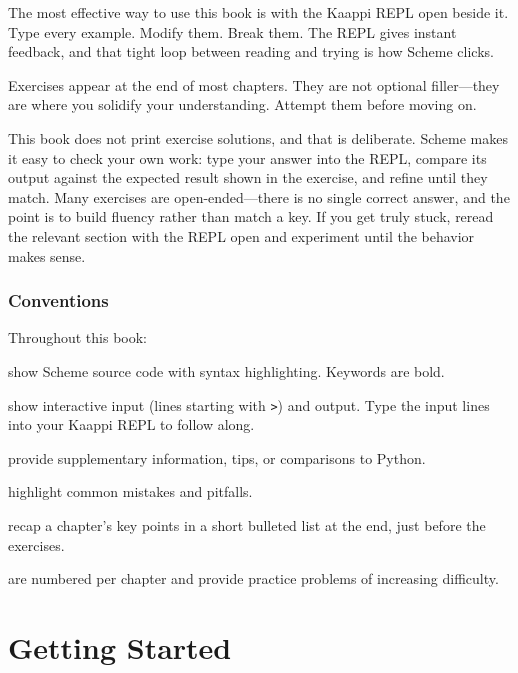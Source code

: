 \documentclass[11pt,twoside,openright]{memoir}
\begin{document}
The most effective way to use this book is with the Kaappi REPL open beside it. Type every example. Modify them. Break them. The REPL gives instant feedback, and that tight loop between reading and trying is how Scheme clicks.

Exercises appear at the end of most chapters. They are not optional filler---they are where you solidify your understanding. Attempt them before moving on.

This book does not print exercise solutions, and that is deliberate. Scheme makes it easy to check your own work: type your answer into the REPL, compare its output against the expected result shown in the exercise, and refine until they match. Many exercises are open-ended---there is no single correct answer, and the point is to build fluency rather than match a key. If you get truly stuck, reread the relevant section with the REPL open and experiment until the behavior makes sense.

\section*{Conventions}

Throughout this book:

\begin{description}[leftmargin=1em, labelindent=0em]
    \item[Code listings] show Scheme source code with syntax highlighting. Keywords are bold.
    \item[REPL sessions] show interactive input (lines starting with \texttt{>}) and output. Type the input lines into your Kaappi REPL to follow along.
    \item[Notes] provide supplementary information, tips, or comparisons to Python.
    \item[Warnings] highlight common mistakes and pitfalls.
    \item[Summaries] recap a chapter's key points in a short bulleted list at the end, just before the exercises.
    \item[Exercises] are numbered per chapter and provide practice problems of increasing difficulty.
\end{description}

\cleardoublepage

\mainmatter
\pagestyle{kaappibook}

\part{Getting Started}
\end{document}

